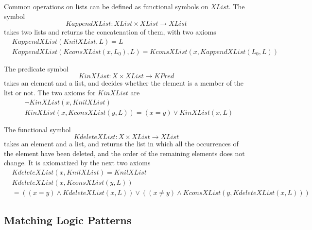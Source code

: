 \documentclass[UTF8,11pt]{article}
\theoremstyle{plain}
\theoremstyle{definition}
\theoremstyle{remark}
\newcommand{\KPred}{\mathit{KPred}}
\newcommand{\XList}{\mathit{XList}}
\newcommand{\KnilXList}{\mathit{KnilXList}}
\newcommand{\KconsXList}{\mathit{KconsXList}}
\newcommand{\KappendXList}{\mathit{KappendXList}}
\newcommand{\KinXList}{\mathit{KinXList}}
\newcommand{\KdeleteXList}{\mathit{KdeleteXList}}
\begin{document}
Common operations on lists can be defined as functional symbols on $\XList$.
The symbol $$\KappendXList \colon \XList \times \XList \to \XList$$ 
takes two lists and returns the concatenation of them, with two axioms
\begin{align*}
  & \KappendXList(\KnilXList, L) = L
  \\
  & \KappendXList(\KconsXList(x, L_0), L) = \KconsXList(x, \KappendXList(L_0, L))
\end{align*}

The predicate symbol $$\KinXList \colon \mathit{X} \times \XList \to \KPred$$
takes an element and a list, and decides whether the element is a member of the list or not. The two axioms for $\KinXList$ are
\begin{align*}
  & \neg \KinXList(x, \KnilXList)
  \\
  & \KinXList(x, \KconsXList(y, L)) = (x = y) \vee \KinXList(x, L)
\end{align*}

The functional symbol $$\KdeleteXList \colon \mathit{X} \times \XList \to \XList$$
takes an element and a list, and returns the list in which all the occurrences
of the element have been deleted, and the order of the remaining elements does not
change.
It is axiomatized by the next two axioms
\begin{align*}
  & \KdeleteXList(x, \KnilXList) = \KnilXList
  \\
  & \KdeleteXList(x, \KconsXList(y, L))
  \\
  & = ((x = y) \wedge \KdeleteXList(x, L)) \vee ((x \neq y) \wedge \KconsXList(y, \KdeleteXList(x, L)))
\end{align*}


\subsection{Matching Logic Patterns}
\label{sec:matching-logic-patterns}
\end{document}
